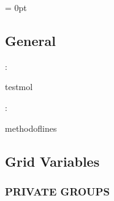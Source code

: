 \parskip = 0pt

\vspace{3mm} \subsection*{General}

: 

testmol
\vspace{2mm}

: 

methodoflines
\vspace{2mm}
\subsection*{Grid Variables}
\vspace{5mm}\subsubsection{PRIVATE GROUPS}

\vspace{5mm}

